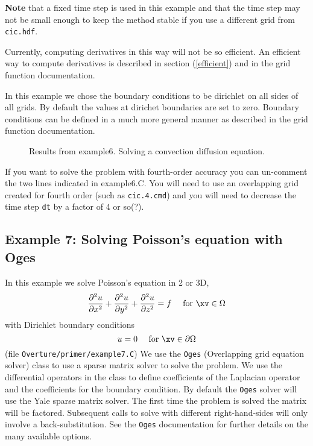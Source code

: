\documentclass{article}
\begin{document}
{\bf Note} that a fixed time step is used in this example and that
the time step may not be small enough to keep the method stable if you
use a different grid from {\tt cic.hdf}.

Currently, computing derivatives in this way will not be so
efficient. An efficient way to compute derivatives is described
in section (\ref{efficient}) and in the grid function documentation.

In this example we chose the boundary conditions to be dirichlet
on all sides of all grids. By default the values at dirichet
boundaries are set to zero. Boundary conditions can be defined
in a much more general manner as described in the grid function
documentation.


\begin{figure}
  \begin{center}
  \caption{Results from example6. Solving a convection diffusion equation.}
  \end{center} \label{fig:solver}
\end{figure}

If you want to solve the problem with fourth-order accuracy you can 
un-comment the two lines indicated in example6.C. You will need to use an
overlapping grid created for fourth order (such as {\tt cic.4.cmd}) and
you will need to decrease the time step {\tt dt} by a factor of 4 or so(?).

\vfill\eject
\subsection{Example 7: Solving Poisson's equation with Oges}

In this example we solve Poisson's equation in 2 or 3D,
$$
   {\partial^2 u \over \partial x^2} 
 + {\partial^2 u \over \partial y^2} 
 + {\partial^2 u \over \partial z^2} 
= f ~~~~\mbox{for~} \xv \in \Omega
$$
with Dirichlet boundary conditions
$$
    u=0 ~~~~\mbox{for~} \xv \in \partial\Omega
$$
(file {\tt Overture/primer/example7.C})
{\footnotesize
{}
}
We use the {\tt Oges} (Overlapping grid equation solver)
class to use a sparse matrix solver to solve the problem.
We use the differential operators in the {\tt \CGO} class
to define coefficients of the Laplacian operator and
the coefficients for the boundary condition.
By default the {\tt Oges} solver will use the Yale
sparse matrix solver. The first time the problem
is solved the matrix will be factored. Subsequent calls
to solve with different right-hand-sides will only 
involve a back-substitution. See the {\tt Oges} 
documentation for further details on the many 
available options.
\end{document}
